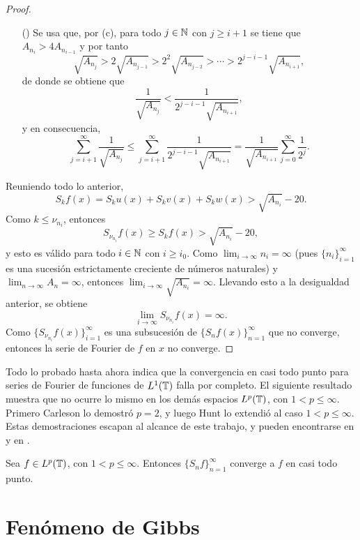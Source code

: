 \documentclass[a4paper, 12pt, oneside]{book}
\begin{document}
\begin{proof}
\begin{itemize}
        \item[(\asts{2})] Se usa que, por (c), para todo $j \in \mathbb N$ con $j \geq i+1$ se tiene que $A_{n_i} > 4A_{n_{i-1}}$ y por tanto
        \[\sqrt{A_{n_j}} > 2\sqrt{A_{n_{j-1}}} > 2^2 \sqrt{A_{n_{j-2}}} > \cdots > 2^{j-i-1}\sqrt{A_{n_{i+1}}},\]
        de donde se obtiene que
        \[\frac{1}{\sqrt{A_{n_j}}} < \frac{1}{2^{j-i-1}\sqrt{A_{n_{i+1}}}},\]
        y en consecuencia,
        \[\sum_{j=i+1}^\infty \frac{1}{\sqrt{A_{n_j}}} \leq \sum_{j=i+1}^\infty \frac{1}{2^{j-i-1}\sqrt{A_{n_{i+1}}}} = \frac{1}{\sqrt{A_{n_{i+1}}}}\sum_{j=0}^\infty \frac{1}{2^j}.\]
    \end{itemize}
    Reuniendo todo lo anterior,
    \[S_kf(x) = S_ku(x)+S_kv(x)+S_kw(x)> \sqrt{A_{n_i}}-20.\]
    Como $k \leq \nu_{n_i}$, entonces
    \[S_{\nu_{n_i}}f(x) \geq S_kf(x) > \sqrt{A_{n_i}}-20,\]
    y esto es válido para todo $i \in \mathbb N$ con $i \geq i_0$. Como $\lim_{i \to \infty} n_i = \infty$ (pues $\{n_i\}_{i=1}^\infty$ es una sucesión estrictamente creciente de números naturales) y $\lim_{n \to \infty} A_n = \infty$, entonces $\lim_{i \to \infty} \sqrt{A_{n_i}} = \infty$. Llevando esto a la desigualdad anterior, se obtiene
    \[\lim_{i \to \infty} S_{\nu_{n_i}}f(x) = \infty.\]
    Como $\{S_{\nu_{n_i}}f(x)\}_{i=1}^\infty$ es una subsucesión de $\{S_nf(x)\}_{n=1}^\infty$ que no converge, entonces la serie de Fourier de $f$ en $x$ no converge.
\end{proof}

Todo lo probado hasta ahora indica que la convergencia en casi todo punto para series de Fourier de funciones de $L^1(\mathbb T)$ falla por completo. El siguiente resultado muestra que no ocurre lo mismo en los demás espacios $L^p(\mathbb T)$, con $1 < p \leq \infty$. Primero Carleson lo demostró $p = 2$, y luego Hunt lo extendió al caso $1<p\leq\infty$. Estas demostraciones escapan al alcance de este trabajo, y pueden encontrarse en \cite{carleson} y en \cite{hunt}.

\begin{theorem}
    Sea $f \in L^p(\mathbb T)$, con $1 < p \leq \infty$. Entonces $\{S_nf\}_{n=1}^\infty$ converge a $f$ en casi todo punto.
\end{theorem}

\section{Fenómeno de Gibbs}
\end{document}
